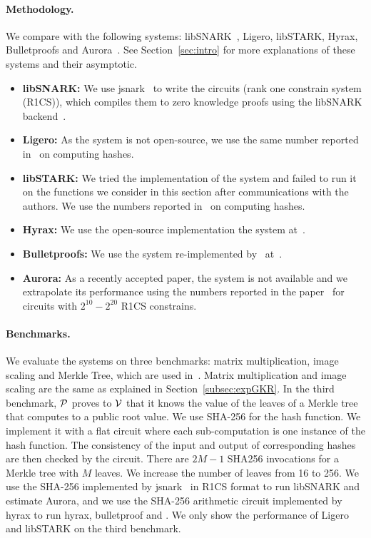 \paragraph{Methodology.} We compare with the following systems: libSNARK~\cite{libsnark}, Ligero\cite{ligero}, libSTARK\cite{libstark}, Hyrax\cite{hyrax},  Bulletproofs\cite{bulletproofs} and Aurora~\cite{aurora}. See Section~\ref{sec:intro} for more explanations of these systems and their asymptotic. 
\begin{itemize}
\item \textbf{libSNARK:} We use jsnark~\cite{jsnark} to write the circuits (rank one constrain system (R1CS)), which compiles them to zero knowledge proofs using the libSNARK backend~\cite{libsnark}. 

\item\textbf{Ligero:} As the system is not open-source, we use the same number reported in~\cite{ligero} on computing hashes.

\item\textbf{libSTARK:} We tried the implementation of the system and failed to run it on the functions we consider in this section after communications with the authors. We use the numbers reported in~\cite{libstark} on computing hashes. 

\item\textbf{Hyrax:} We use the open-source implementation the system at~\cite{??}.

\item\textbf{Bulletproofs:} We use the system re-implemented by~\cite{hyrax} at~\cite{??}.


\item\textbf{Aurora:} As a recently accepted paper, the system is not available and we extrapolate its performance using the numbers reported in the paper~\cite{aurora} for circuits with $2^{10}-2^{20}$ R1CS constrains.

\end{itemize}


\paragraph{Benchmarks.} We evaluate the systems on three benchmarks: matrix multiplication, image scaling and Merkle Tree\cite{merkletree}, which are used in~\cite{hyrax}. Matrix multiplication and image scaling are the same as explained in Section~\ref{subsec:expGKR}. In the third benchmark, $\P$ proves to $\V$ that it knows the value of the leaves of a Merkle tree\cite{merkletree} that computes to a public root value\cite{blum1994checking}. We use SHA-256 for the hash function. We implement it with a flat circuit where each sub-computation is one instance of the hash function. The consistency of the input and output of corresponding hashes are then checked by the circuit. There are $2M - 1$ SHA256 invocations for a Merkle tree with $M$ leaves. We increase the number of leaves from 16 to 256. We use the SHA-256 implemented by jsnark~\cite{jsnark} in R1CS format to run libSNARK and estimate Aurora, and we use the SHA-256 arithmetic circuit implemented by hyrax to run hyrax, bulletproof and \name. We only show the performance of Ligero and libSTARK on the third benchmark.

